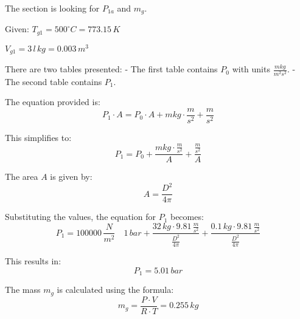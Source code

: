 The section is looking for \( P_{1a} \) and \( m_g \).

Given: \( T_{g1} = 500^\circ C = 773.15\,K \)

\( V_{g1} = 3\,l\,kg = 0.003\,m^3 \)

There are two tables presented:
- The first table contains \( P_0 \) with units \( \frac{mkg}{m^2s^2} \).
- The second table contains \( P_1 \).

The equation provided is:
\[ P_1 \cdot A = P_0 \cdot A + mkg \cdot \frac{m}{s^2} + \frac{m}{s^2} \]

This simplifies to:
\[ P_1 = P_0 + \frac{mkg \cdot \frac{m}{s^2}}{A} + \frac{\frac{m}{s^2}}{A} \]

The area \( A \) is given by:
\[ A = \frac{D^2}{4\pi} \]

Substituting the values, the equation for \( P_1 \) becomes:
\[ P_1 = 100000\,\frac{N}{m^2} \quad 1\,bar + \frac{32\,kg \cdot 9.81\,\frac{m}{s^2}}{\frac{D^2}{4\pi}} + \frac{0.1\,kg \cdot 9.81\,\frac{m}{s^2}}{\frac{D^2}{4\pi}} \]

This results in:
\[ P_1 = 5.01\,bar \]

The mass \( m_g \) is calculated using the formula:
\[ m_g = \frac{P \cdot V}{R \cdot T} = 0.255\,kg \]